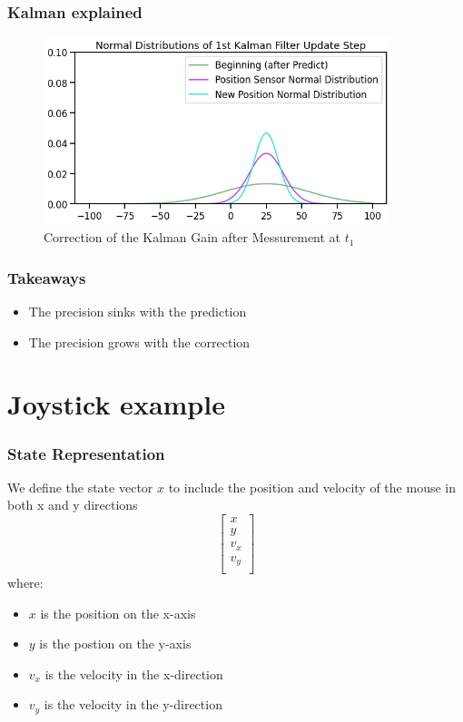\documentclass{beamer}
\begin{document}
\begin{frame}
    \frametitle{Kalman explained}
    \begin{figure}
        \centering
        \includegraphics[width=0.9\textwidth]{images/05_correction.png}
        \caption{Correction of the Kalman Gain after Messurement at \(t_1\)}
    \end{figure}
\end{frame}

\begin{frame}
    \frametitle{Takeaways}
    \begin{itemize}
        \item The precision sinks with the prediction
        \item The precision grows with the correction
    \end{itemize}
    
\end{frame}

\section{Joystick example}

\begin{frame}
    \frametitle{State Representation}
    We define the state vector \(x\) to include the position and velocity of the mouse in both x and y directions
    \[
        \left[ \begin{array}{r}
            x  \\
            y  \\
            v_{x}  \\
            v_{y} \\
        \end{array}\right]    
    \]
    where:
    \begin{itemize}
        \item \(x\) is the position on the x-axis
        \item \(y\) is the postion on the y-axis
        \item \(v_{x}\) is the velocity in the x-direction
        \item \(v_{y}\) is the velocity in the y-direction

    \end{itemize}
\end{frame}
\end{document}
